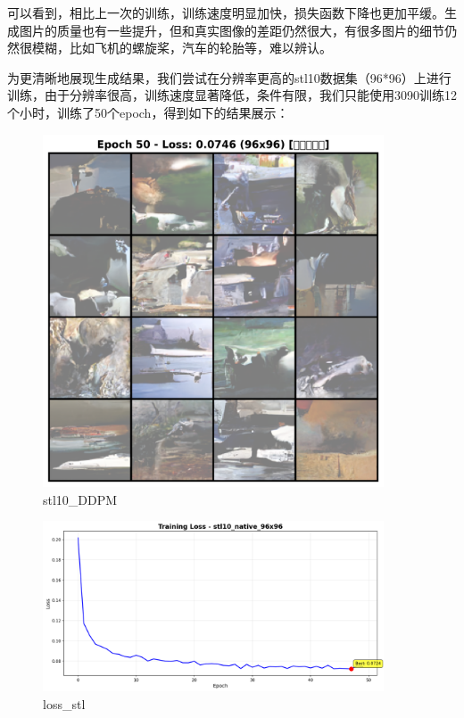 \documentclass{ctexart}
\begin{document}
\noindent
可以看到，相比上一次的训练，训练速度明显加快，损失函数下降也更加平缓。生成图片的质量也有一些提升，但和真实图像的差距仍然很大，有很多图片的细节仍然很模糊，比如飞机的螺旋桨，汽车的轮胎等，难以辨认。

\noindent
为更清晰地展现生成结果，我们尝试在分辨率更高的stl10数据集（96*96）上进行训练，由于分辨率很高，训练速度显著降低，条件有限，我们只能使用3090训练12个小时，训练了50个epoch，得到如下的结果展示：
\begin{figure}[htb]
    \centering
    \includegraphics[width=0.9\textwidth]{epoch_50_samples_stl.png}
    \caption{stl10_DDPM}
    \label{fig:cifar10_grid}
\end{figure}

\begin{figure}[htb]
    \centering
    \includegraphics[width=0.9\textwidth]{loss_stl.png}
    \caption{loss_stl}
    \label{fig:loss_retrain}
\end{figure}
\end{document}
